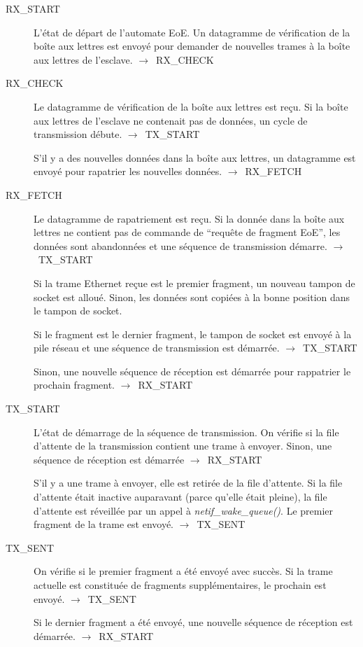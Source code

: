 \documentclass[a4paper,12pt,BCOR6mm,bibtotoc,idxtotoc]{scrbook}
\begin{document}
\begin{description}
\item[RX\_START] L'\'etat de d\'epart de l'automate EoE.  Un datagramme de
  v\'erification de la bo\^ite aux lettres est envoy\'e pour demander de
  nouvelles trames \`a la bo\^ite aux lettres de
  l'esclave. $\rightarrow$~RX\_CHECK

\item[RX\_CHECK] Le datagramme de v\'erification de la bo\^ite aux lettres
  est re\c{c}u. Si la bo\^ite aux lettres de l'esclave ne contenait pas de
  donn\'ees, un cycle de transmission d\'ebute. $\rightarrow$~TX\_START

  S'il y a des nouvelles donn\'ees dans la bo\^ite aux lettres, un
  datagramme est envoy\'e pour rapatrier les nouvelles donn\'ees.
  $\rightarrow$~RX\_FETCH

\item[RX\_FETCH] Le datagramme de rapatriement est re\c{c}u.  Si la
  donn\'ee dans la bo\^ite aux lettres ne contient pas de commande de
  ``requ\^ete de fragment EoE'', les donn\'ees sont abandonn\'ees et une
  s\'equence de transmission d\'emarre.  $\rightarrow$~TX\_START

  Si la trame Ethernet re\c{c}ue est le premier fragment, un nouveau
  tampon de socket est allou\'e. Sinon, les donn\'ees sont copi\'ees
  \`a la bonne position dans le tampon de socket.

  Si le fragment est le dernier fragment, le tampon de socket est
  envoy\'e \`a la pile r\'eseau et une s\'equence de transmission est
  d\'emarr\'ee.  $\rightarrow$~TX\_START

  Sinon, une nouvelle s\'equence de r\'eception est d\'emarr\'ee pour
  rappatrier le prochain fragment.  $\rightarrow$~RX\_\-START

\item[TX\_START] L'\'etat de d\'emarrage de la s\'equence de
  transmission.  On v\'erifie si la file d'attente de la transmission
  contient une trame \`a envoyer. Sinon, une s\'equence de r\'eception
  est d\'emarr\'ee $\rightarrow$~RX\_START

  S'il y a une trame \`a envoyer, elle est retir\'ee de la file
  d'attente. Si la file d'attente \'etait inactive auparavant (parce
  qu'elle \'etait pleine), la file d'attente est r\'eveill\'ee par un
  appel \`a \textit{netif\_wake\_queue()}.  Le premier fragment de la
  trame est envoy\'e.  $\rightarrow$~TX\_SENT

\item[TX\_SENT] On v\'erifie si le premier fragment a \'et\'e envoy\'e
  avec succ\`es. Si la trame actuelle est constitu\'ee de fragments
  suppl\'ementaires, le prochain est envoy\'e.  $\rightarrow$~TX\_SENT

  Si le dernier fragment a \'et\'e envoy\'e, une nouvelle s\'equence
  de r\'eception est d\'emarr\'ee.  $\rightarrow$~RX\_START

\end{description}
\end{document}
